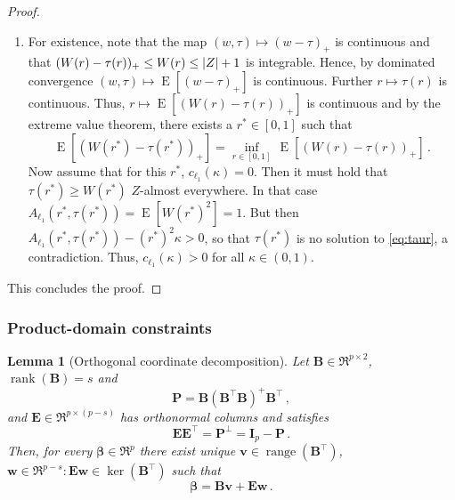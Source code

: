 \documentclass{article}
\makeatletter
\DeclareMathOperator{\expect}{E}
\newtheorem{lemma}{Lemma}
\theoremstyle{definition}
\newcommand{\abs}[1]{%
	\ensuremath{%
		\if@display
		\left| #1 \right|
		\else
		\lvert #1 \rvert
		\fi
	}%
}
\newcommand*{\bb}{\boldsymbol}
\def\bw {\bb{w}}
\def\bv{\bb{v}}
\def\bB{\bb{B}}
\def\bbeta{\bb{\beta}}
\newcommand{\rank}{\operatorname{rank}}
\makeatother
\begin{document}
\begin{bibunit}
\begin{proof}
\begin{enumerate}[label=(\roman{*})]
	   Finally to show that $\tau(r)$ is continuous, consider any convergent sequence $\{r_n\}_{n \in \mathbb{N}}, r_n \in [0,1]$ with limit $r^* \in [0,1]$.
	   Concurrently, let $\tau_n$ be the unique solution to $A_{\ell_1}(r_n, \tau) - r_n^2\kappa = 0$. Since $\tau_{n} \in [0, \tau(1)]$, by Bolzano--Weierstrass \citep[Theorem~3.6(b)]{rudin+etal:1976}, there
	   must exist a convergent subsequence, call it $\tau_{n_k}$ with limit say $\bar{\tau}$.
	   Then by joint continuity of $A_{\ell_1}(r,\tau)$, it follows that
	   $$
		0 = \lim\limits_{k \to \infty} A_{\ell_1}(r_{n_k}, \tau_{n_k}) - r^2_{n_k} \kappa = A_{\ell_1}(r^*, \bar \tau) - (r^*)^2\kappa \,.
	   $$
	   By uniqueness of $\tau(r)$, $\bar{\tau} = \tau(r^*)$ and thus every convergent subsequence must converge to $\tau(r^*)$. But then also
	   $\tau_{n} \to \tau(r^*)$. If this were not the case, then $\tau_n$ would have to have a non-convergent subsequence for which $\abs{\tau_{n_k} - \bar \tau} > \epsilon$.
	   For $\tau_{n_k}$, which is still bounded, another convergent subsequence must exist and thus converge to $\bar \tau$, which contradicts $\abs{\tau_{n_k} - \bar \tau} > \epsilon$.
	   \item For existence, note that the map $(w,\tau) \mapsto (w - \tau)_{+}$ is continuous and that
	   $(W(r) - \tau(r))_{+} \leq W(r) \leq \abs{Z} + 1$ is integrable. Hence, by dominated convergence $(w, \tau) \mapsto \expect[(w - \tau)_{+}]$ is
	   continuous. Further $r \mapsto \tau(r)$ is continuous. Thus,
	   $r \mapsto \expect[(W(r)-\tau(r))_{+}]$ is continuous and by the extreme value theorem, there exists a $r^* \in [0,1]$ such that
	   $$
		\expect[(W(r^*) - \tau(r^*))_{+}] = \underset{r \in [0,1]}{\inf} \, \expect[(W(r) - \tau(r))_{+}] \,.
 	   $$
	   Now assume that for this $r^*$, $c_{\ell_1}(\kappa) = 0$. Then it must hold that $\tau(r^*) \geq W(r^*)$ $Z$-almost everywhere.
	   In that case $A_{\ell_1}(r^*, \tau(r^*)) = \expect[W(r^*)^2] = 1$. But then $A_{\ell_1}(r^*, \tau(r^*)) - (r^*)^2 \kappa > 0$, so that
	   $\tau(r^*)$ is no solution to \eqref{eq:taur}, a contradiction. Thus, $c_{\ell_1}(\kappa) >0$ for all $\kappa \in (0,1)$.
	\end{enumerate}
	This concludes the proof.
\end{proof}


\subsubsection{Product-domain constraints}


\begin{lemma}[Orthogonal coordinate decomposition]
\label{lemma:orth_decomp}
Let $\bB\in\Re^{p\times 2}$, $ \rank(\bb B) = s$ and
$$
\bb P = \bB (\bB^\top \bB)^{+} \bB^\top\,, 
$$
and $\bb E \in\Re^{p\times (p - s)}$ has orthonormal columns and satisfies
$$
\bb E \bb E^\top = \bb P^{\perp} = \bb{I}_p - \bb P \,. 
$$
Then, for every $\bbeta\in\Re^p$ there exist unique $\bv \in \operatorname{range}(\bB^\top)$,
$\bw \in \Re^{p-s}: \bb E \bw \in \operatorname{ker}(\bb B^\top)$ such that
$$
\bbeta = \bB\bv + \bb E\bw \,.
$$
\end{lemma}


\end{bibunit}
\end{document}
